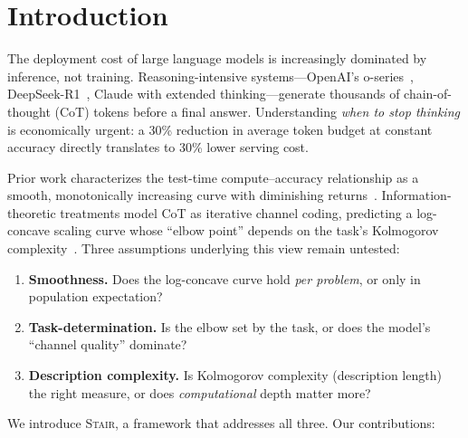 \documentclass{article}
\newcommand{\method}{\textsc{Stair}}
\begin{document}
\section{Introduction}
\label{sec:intro}

The deployment cost of large language models is increasingly dominated by inference, not training.  Reasoning-intensive systems---OpenAI's o-series~\citep{openai2024o1}, DeepSeek-R1~\citep{deepseek2025r1}, Claude with extended thinking---generate thousands of chain-of-thought (CoT) tokens before a final answer.  Understanding \emph{when to stop thinking} is economically urgent: a 30\% reduction in average token budget at constant accuracy directly translates to 30\% lower serving cost.

Prior work characterizes the test-time compute--accuracy relationship as a smooth, monotonically increasing curve with diminishing returns~\citep{snell2024scaling,kaplan2020scaling}.  Information-theoretic treatments model CoT as iterative channel coding, predicting a log-concave scaling curve whose ``elbow point'' depends on the task's Kolmogorov complexity~\citep{polyanskiy2024it}.  Three assumptions underlying this view remain untested:

\begin{enumerate}[leftmargin=*,itemsep=2pt]
    \item \textbf{Smoothness.}  Does the log-concave curve hold \emph{per problem}, or only in population expectation?
    \item \textbf{Task-determination.}  Is the elbow set by the task, or does the model's ``channel quality'' dominate?
    \item \textbf{Description complexity.}  Is Kolmogorov complexity (description length) the right measure, or does \emph{computational} depth matter more?
\end{enumerate}

We introduce \method{}, a framework that addresses all three.  Our contributions:
\end{document}
